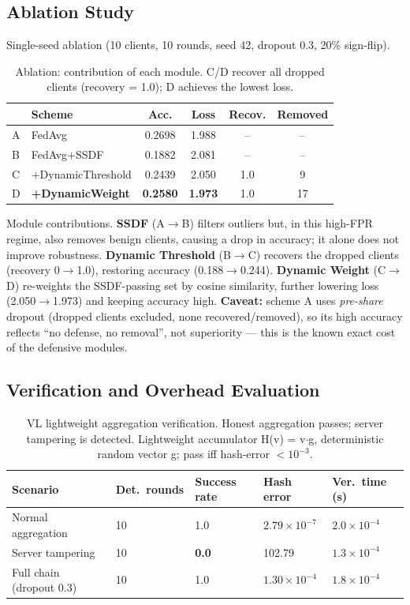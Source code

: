 \documentclass[10pt,conference]{IEEEtran}
\begin{document}
\subsection{Ablation Study}

Single-seed ablation (10 clients, 10 rounds, seed 42, dropout 0.3, 20\% sign-flip).

\begin{table}[t]
\caption{Ablation: contribution of each module. C/D recover all dropped clients (recovery = 1.0); D achieves the lowest loss.}
\label{tab:ablation}
\centering
\small
\begin{tabular}{llcccc}
\toprule
 & Scheme & Acc. & Loss & Recov. & Removed\\
\midrule
A & FedAvg & 0.2698 & 1.988 & -- & --\\
B & FedAvg+SSDF & 0.1882 & 2.081 & -- & --\\
C & +DynamicThreshold & 0.2439 & 2.050 & 1.0 & 9\\
D & \textbf{+DynamicWeight} & \textbf{0.2580} & \textbf{1.973} & 1.0 & 17\\
\bottomrule
\end{tabular}
\end{table}

Module contributions. \textbf{SSDF} (A$\to$B) filters outliers but, in this high-FPR regime, also removes benign clients, causing a drop in accuracy; it alone does not improve robustness. \textbf{Dynamic Threshold} (B$\to$C) recovers the dropped clients (recovery 0$\to$1.0), restoring accuracy (0.188$\to$0.244). \textbf{Dynamic Weight} (C$\to$D) re-weights the SSDF-passing set by cosine similarity, further lowering loss (2.050$\to$1.973) and keeping accuracy high. \textbf{Caveat:} scheme A uses \emph{pre-share} dropout (dropped clients excluded, none recovered/removed), so its high accuracy reflects ``no defense, no removal'', not superiority --- this is the known exact cost of the defensive modules.

\subsection{Verification and Overhead Evaluation}

\begin{table}[t]
\caption{VL lightweight aggregation verification. Honest aggregation passes; server tampering is detected. Lightweight accumulator H(v) = v$\cdot$g, deterministic random vector g; pass iff hash-error $<10^{-3}$.}
\label{tab:vl}
\centering
\small
\begin{tabular}{lllll}
\toprule
Scenario & Det.\ rounds & Success rate & Hash error & Ver.\ time (s)\\
\midrule
Normal aggregation & 10 & 1.0 & $2.79\times10^{-7}$ & $2.0\times10^{-4}$\\
Server tampering & 10 & \textbf{0.0} & 102.79 & $1.3\times10^{-4}$\\
Full chain (dropout 0.3) & 10 & 1.0 & $1.30\times10^{-4}$ & $1.8\times10^{-4}$\\
\bottomrule
\end{tabular}
\end{table}
\end{document}
